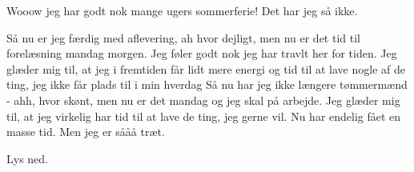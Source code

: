 \documentclass[a4paper,11pt]{article}
\begin{document}
\begin{sketch}
Wooow jeg har godt nok mange ugers sommerferie!
Det har jeg så ikke.

Så nu er jeg færdig med aflevering, ah hvor dejligt, men nu er det tid til forelæsning mandag morgen. Jeg føler godt nok jeg har travlt her for tiden. Jeg glæder mig til, at jeg i fremtiden får lidt mere energi og tid til at lave nogle af de ting, jeg ikke får plads til i min hverdag
Så nu har jeg ikke længere tømmermænd - ahh, hvor skønt, men nu er det mandag og jeg skal på arbejde. Jeg glæder mig til, at jeg virkelig har tid til at lave de ting, jeg gerne vil.
Nu har endelig fået en masse tid. Men jeg er sååå træt.

\scene Lys ned.


\end{sketch}
\end{document}
